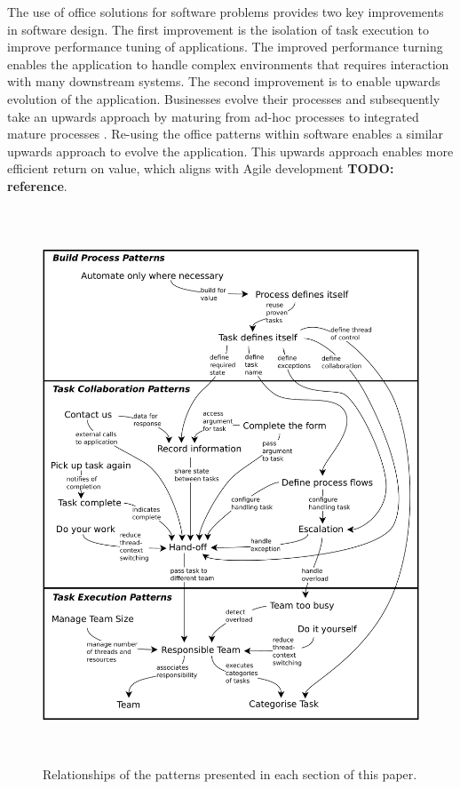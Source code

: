 \documentclass[prodmode]{style/acmlarge}
\begin{document}
The use of office solutions for software problems provides two key improvements
in software design. The first improvement is the isolation of task execution to
improve performance tuning of applications.  The improved performance turning
enables the application to handle complex environments that requires interaction
with many downstream systems.  The second improvement is to enable upwards
evolution of the application.  Businesses evolve their processes and
subsequently take an upwards approach by maturing from ad-hoc processes to
integrated mature processes \cite{process-maturity-global}.  Re-using the office
patterns within software enables a similar upwards approach to evolve the
application.  This upwards approach enables more efficient return on value,
which aligns with Agile development \textbf{TODO: reference}.

\begin{figure}[!t]
\centering
\includegraphics[height=6.5in]{PatternRelationships}
\caption{Relationships of the patterns presented in each section of this paper.}
\label{fig:PatternRelationships}
\end{figure}
\end{document}

